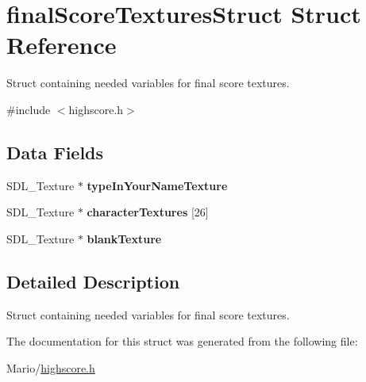 \hypertarget{structfinal_score_textures_struct}{}\section{final\+Score\+Textures\+Struct Struct Reference}
\label{structfinal_score_textures_struct}


Struct containing needed variables for final score textures.  




{\ttfamily \#include $<$highscore.\+h$>$}

\subsection*{Data Fields}
\begin{DoxyCompactItemize}
\item 
\mbox{\label{structfinal_score_textures_struct_ae55c32a713fe8e63f95e7fae0edd15f1}} 
S\+D\+L\+\_\+\+Texture $\ast$ {\bfseries type\+In\+Your\+Name\+Texture}
\item 
\mbox{\label{structfinal_score_textures_struct_afdc51130ea106a0f38776aa4e8f2f818}} 
S\+D\+L\+\_\+\+Texture $\ast$ {\bfseries character\+Textures} \mbox{[}26\mbox{]}
\item 
\mbox{\label{structfinal_score_textures_struct_a8b20f61f8f9a1477fdccb27d1f5f5231}} 
S\+D\+L\+\_\+\+Texture $\ast$ {\bfseries blank\+Texture}
\end{DoxyCompactItemize}


\subsection{Detailed Description}
Struct containing needed variables for final score textures. 

The documentation for this struct was generated from the following file\+:\begin{DoxyCompactItemize}
\item 
Mario/\mbox{\hyperlink{highscore_8h}{highscore.\+h}}\end{DoxyCompactItemize}

